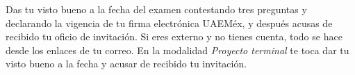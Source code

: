 \documentclass[11pt,a4paper]{article}
\begin{document}
{\small\tableofcontents}
\newpage
\begin{quevasahacer}
Das tu visto bueno a la fecha del examen contestando tres preguntas y declarando la vigencia de tu firma electrónica UAEMéx, y después acusas de recibido tu oficio de invitación. Si eres externo y no tienes cuenta, todo se hace desde los enlaces de tu correo. En la modalidad \emph{Proyecto terminal} te toca dar tu visto bueno a la fecha y acusar de recibido tu invitación.
\end{quevasahacer}




\end{document}
